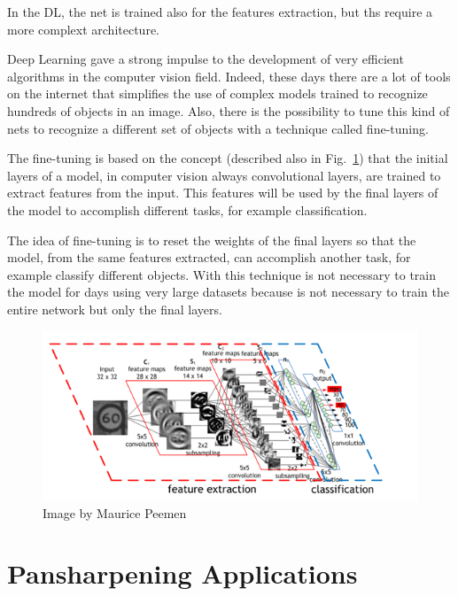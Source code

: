 \documentclass[12pt]{report}
\begin{document}
In the DL, the net is trained also for the features extraction, but ths require a more complext architecture.

Deep Learning gave a strong impulse to the development of very efficient algorithms in the computer vision field. 
Indeed, these days there are a lot of tools on the internet that simplifies the use of complex models trained to 
recognize hundreds of objects in an image. Also, there is the possibility to tune this kind of  nets to recognize a different set of objects with a technique called fine-tuning. 

The fine-tuning is based on the concept (described also in Fig.~\ref{fig:dl-architecture}) that the initial layers of a model, 
in computer vision always convolutional layers, are trained to extract features from the input. 
This features will be used by the final layers of the model to accomplish different tasks, for example classification. 

The idea of fine-tuning is to reset the weights of the final layers so that the model, from the same features extracted, can accomplish another task, for example classify different objects. 
With this technique is not necessary to train the model for days using very large datasets because is not necessary to train the entire network but only the final layers. 
\begin{figure}[t]
    \centering
    \includegraphics[scale=1.2]{dlarchitecture.png}
    \caption{Image by Maurice Peemen}
    \label{fig:dl-architecture}
\end{figure}


\newpage

\section{Pansharpening Applications}
\end{document}
